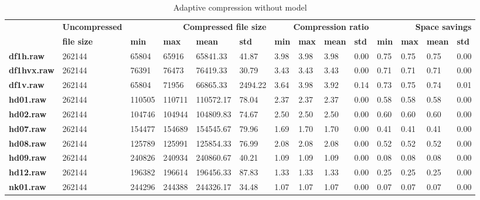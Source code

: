 \begin{table}
\centering
\footnotesize
\begin{tabular}{l|l|llll|llll|llll}
     & \textbf{Uncompressed} & \multicolumn{4}{r|}{\textbf{Compressed file size}} & \multicolumn{4}{r|}{\textbf{Compression ratio}} & \multicolumn{4}{r}{\textbf{Space savings}} \\
     & \textbf{file size} & \textbf{min} & \textbf{max} & \textbf{mean} & \textbf{std} & \textbf{min} & \textbf{max} & \textbf{mean} & \textbf{std} & \textbf{min} & \textbf{max} & \textbf{mean} & \textbf{std} \\
\hline
    \textbf{df1h.raw} & 262144 & 65804 & 65916 & 65841.33 & 41.87 & 3.98 & 3.98 & 3.98 & 0.00 & 0.75 & 0.75 & 0.75 & 0.00 \\
    \textbf{df1hvx.raw} & 262144 & 76391 & 76473 & 76419.33 & 30.79 & 3.43 & 3.43 & 3.43 & 0.00 & 0.71 & 0.71 & 0.71 & 0.00 \\
    \textbf{df1v.raw} & 262144 & 65804 & 71956 & 66865.33 & 2494.22 & 3.64 & 3.98 & 3.92 & 0.14 & 0.73 & 0.75 & 0.74 & 0.01 \\
    \textbf{hd01.raw} & 262144 & 110505 & 110711 & 110572.17 & 78.04 & 2.37 & 2.37 & 2.37 & 0.00 & 0.58 & 0.58 & 0.58 & 0.00 \\
    \textbf{hd02.raw} & 262144 & 104746 & 104944 & 104809.83 & 74.67 & 2.50 & 2.50 & 2.50 & 0.00 & 0.60 & 0.60 & 0.60 & 0.00 \\
    \textbf{hd07.raw} & 262144 & 154477 & 154689 & 154545.67 & 79.96 & 1.69 & 1.70 & 1.70 & 0.00 & 0.41 & 0.41 & 0.41 & 0.00 \\
    \textbf{hd08.raw} & 262144 & 125789 & 125991 & 125854.33 & 76.99 & 2.08 & 2.08 & 2.08 & 0.00 & 0.52 & 0.52 & 0.52 & 0.00 \\
    \textbf{hd09.raw} & 262144 & 240826 & 240934 & 240860.67 & 40.21 & 1.09 & 1.09 & 1.09 & 0.00 & 0.08 & 0.08 & 0.08 & 0.00 \\
    \textbf{hd12.raw} & 262144 & 196382 & 196614 & 196456.33 & 87.83 & 1.33 & 1.33 & 1.33 & 0.00 & 0.25 & 0.25 & 0.25 & 0.00 \\
    \textbf{nk01.raw} & 262144 & 244296 & 244388 & 244326.17 & 34.48 & 1.07 & 1.07 & 1.07 & 0.00 & 0.07 & 0.07 & 0.07 & 0.00 \\
\end{tabular}
\caption{Adaptive compression without model}
\end{table}
